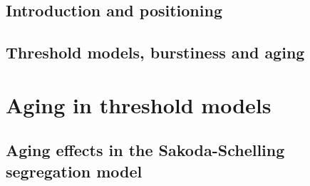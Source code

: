 \documentclass[
	11pt, %
	a4paper,
]{LegrandOrangeBook}
\begin{document}
\mainmatter
{}
\chapterspaceabove{6.75cm}
\chapterspacebelow{7.25cm}

\chapter{Introduction and positioning}


\chapterspaceabove{6.75cm}
\chapterspacebelow{7.25cm}

\chapter{Threshold models, burstiness and aging}



\part{Aging in threshold models}

\chapterspaceabove{6.75cm}
\chapterspacebelow{7.25cm}

\chapter{\label{ch:Aging effects in the Sakoda-Schelling segregation model} Aging effects in the Sakoda-Schelling segregation model}


\chapterspaceabove{6.75cm}
\chapterspacebelow{7.25cm}
\end{document}
